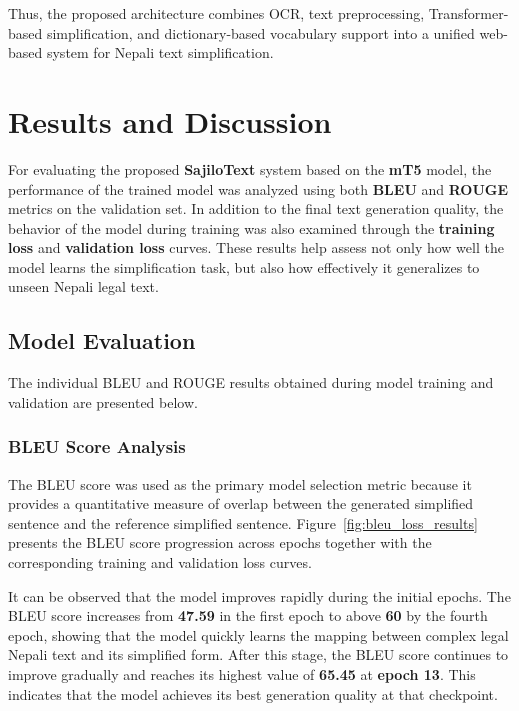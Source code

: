 \documentclass[12pt]{report}
\begin{document}
Thus, the proposed architecture combines OCR, text preprocessing, Transformer-based simplification, and dictionary-based vocabulary support into a unified web-based system for Nepali text simplification.

\chapter{Results and Discussion}


For evaluating the proposed \textbf{SajiloText} system based on the \textbf{mT5} model, the performance of the trained model was analyzed using both \textbf{BLEU} and \textbf{ROUGE} metrics on the validation set. In addition to the final text generation quality, the behavior of the model during training was also examined through the \textbf{training loss} and \textbf{validation loss} curves. These results help assess not only how well the model learns the simplification task, but also how effectively it generalizes to unseen Nepali legal text.

\section{Model Evaluation}

The individual BLEU and ROUGE results obtained during model training and validation are presented below.

\subsection{BLEU Score Analysis}

The BLEU score was used as the primary model selection metric because it provides a quantitative measure of overlap between the generated simplified sentence and the reference simplified sentence. Figure~\ref{fig:bleu_loss_results} presents the BLEU score progression across epochs together with the corresponding training and validation loss curves.

It can be observed that the model improves rapidly during the initial epochs. The BLEU score increases from \textbf{47.59} in the first epoch to above \textbf{60} by the fourth epoch, showing that the model quickly learns the mapping between complex legal Nepali text and its simplified form. After this stage, the BLEU score continues to improve gradually and reaches its highest value of \textbf{65.45} at \textbf{epoch 13}. This indicates that the model achieves its best generation quality at that checkpoint.
\end{document}
